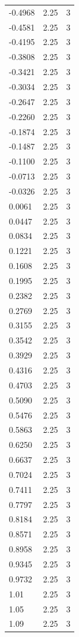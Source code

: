 \begin{longtable}{lrr}
  -0.4968 & 2.25 & 3 \\
  -0.4581 & 2.25 & 3 \\
  -0.4195 & 2.25 & 3 \\
  -0.3808 & 2.25 & 3 \\
  -0.3421 & 2.25 & 3 \\
  -0.3034 & 2.25 & 3 \\
  -0.2647 & 2.25 & 3 \\
  -0.2260 & 2.25 & 3 \\
  -0.1874 & 2.25 & 3 \\
  -0.1487 & 2.25 & 3 \\
  -0.1100 & 2.25 & 3 \\
  -0.0713 & 2.25 & 3 \\
  -0.0326 & 2.25 & 3 \\
  0.0061 & 2.25 & 3 \\
  0.0447 & 2.25 & 3 \\
  0.0834 & 2.25 & 3 \\
  0.1221 & 2.25 & 3 \\
  0.1608 & 2.25 & 3 \\
  0.1995 & 2.25 & 3 \\
  0.2382 & 2.25 & 3 \\
  0.2769 & 2.25 & 3 \\
  0.3155 & 2.25 & 3 \\
  0.3542 & 2.25 & 3 \\
  0.3929 & 2.25 & 3 \\
  0.4316 & 2.25 & 3 \\
  0.4703 & 2.25 & 3 \\
  0.5090 & 2.25 & 3 \\
  0.5476 & 2.25 & 3 \\
  0.5863 & 2.25 & 3 \\
  0.6250 & 2.25 & 3 \\
  0.6637 & 2.25 & 3 \\
  0.7024 & 2.25 & 3 \\
  0.7411 & 2.25 & 3 \\
  0.7797 & 2.25 & 3 \\
  0.8184 & 2.25 & 3 \\
  0.8571 & 2.25 & 3 \\
  0.8958 & 2.25 & 3 \\
  0.9345 & 2.25 & 3 \\
  0.9732 & 2.25 & 3 \\
  1.01 & 2.25 & 3 \\
  1.05 & 2.25 & 3 \\
  1.09 & 2.25 & 3 \\

\end{longtable}

